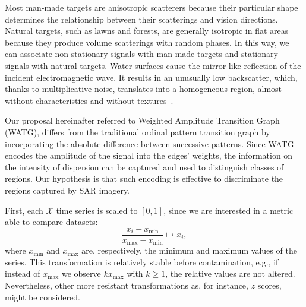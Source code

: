 \documentclass[journal]{IEEEtran}
\begin{document}

Most man-made targets are anisotropic scatterers because their particular shape determines the relationship between their scatterings and vision directions.
Natural targets, such as lawns and forests, are generally isotropic in flat areas because they produce volume scatterings with random phases. In this way, we can associate non-stationary signals with man-made targets and stationary signals with natural targets.  Water surfaces cause the mirror-like reflection of the incident electromagnetic wave. It results in an unusually low backscatter, which, thanks to multiplicative noise, translates into a homogeneous region, almost without characteristics and without textures~\cite{wu2013man}.

Our proposal hereinafter referred to  Weighted Amplitude Transition Graph (WATG), differs from the traditional ordinal pattern transition graph by incorporating the absolute difference between successive patterns. Since WATG encodes the amplitude of the signal into the edges' weights, the information on the intensity of dispersion can be captured and used to distinguish classes of regions. Our hypothesis is that such encoding is effective to discriminate the regions captured by SAR imagery.


First, each $\mathcal{X}$ time series is scaled to $[0, 1]$, since we are interested in a metric able to compare datasets:
\begin{equation}
\frac{x_i - x_{\min}}{x_{\max} - x_{\min}} \longmapsto x_i,
\end{equation}
where $x_{\min}$ and $x_{\max}$ are, respectively, the minimum and maximum values of the series.
This transformation is relatively stable before contamination, e.g., if instead of $x_{\max}$ we observe $k x_{\max}$ with $k\geq 1$, the relative values are not altered. Nevertheless, other more resistant transformations as, for instance, $z$ scores, might be considered.
\end{document}
